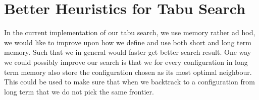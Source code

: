 \section{Better Heuristics for Tabu Search}
In the current implementation of our tabu search, we use memory rather ad hod, we would like to improve upon how we define and use both short and long term memory. Such that we in general would faster get better search result. One way we could possibly improve our search is that we for every configuration in long term memory also store the configuration chosen as its most optimal neighbour. This could be used to make sure that when we backtrack to a configuration from long term that we do not pick the same frontier.  


 



